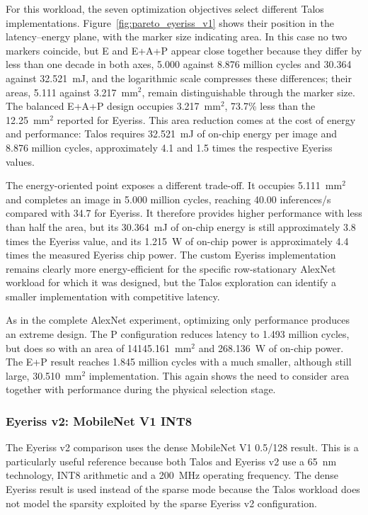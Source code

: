 For this workload, the seven optimization objectives select different
Talos implementations. Figure~\ref{fig:pareto_eyeriss_v1} shows their
position in the latency--energy plane, with the marker size indicating
area. In this case no two markers coincide, but E and E+A+P appear
close together because they differ by less than one decade in both
axes, 5.000 against 8.876 million cycles and 30.364 against
32.521~mJ, and the logarithmic scale compresses these differences;
their areas, 5.111 against 3.217~mm$^2$, remain distinguishable
through the marker size.
The balanced E+A+P design occupies 3.217~mm$^2$, 73.7\% less than the
12.25~mm$^2$ reported for Eyeriss.
This area reduction comes at the cost of energy and performance: Talos
requires 32.521~mJ of on-chip energy per image and 8.876 million cycles,
approximately 4.1 and 1.5 times the respective Eyeriss values.

The energy-oriented point exposes a different trade-off. It occupies
5.111~mm$^2$ and completes an image in 5.000 million cycles, reaching
40.00 inferences/s compared with 34.7 for Eyeriss. It therefore provides
higher performance with less than half the area, but its 30.364~mJ of
on-chip energy is still approximately 3.8 times the Eyeriss value, and
its 1.215~W of on-chip power is approximately 4.4 times the measured
Eyeriss chip power. The custom Eyeriss implementation remains clearly
more energy-efficient for the specific row-stationary AlexNet workload
for which it was designed, but the Talos exploration can identify a
smaller implementation with competitive latency.

As in the complete AlexNet experiment, optimizing only performance
produces an extreme design. The P configuration reduces latency to
1.493 million cycles, but does so with an area of 14145.161~mm$^2$ and
268.136~W of on-chip power. The E+P result reaches 1.845 million cycles
with a much smaller, although still large, 30.510~mm$^2$
implementation. This again shows the need to consider area together
with performance during the physical selection stage.

\subsubsection{Eyeriss v2: MobileNet V1 INT8}
The Eyeriss v2 comparison uses the dense MobileNet V1 0.5/128 result.
This is a particularly useful reference because both Talos and Eyeriss
v2 use a 65~nm technology, INT8 arithmetic and a 200~MHz operating
frequency. The dense Eyeriss result is used instead of the sparse mode
because the Talos workload does not model the sparsity exploited by the
sparse Eyeriss v2 configuration.


